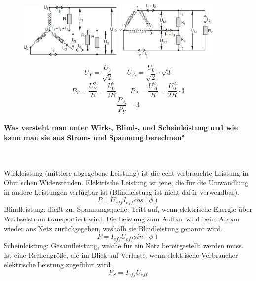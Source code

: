 \documentclass[a4paper, 11pt, ngerman, parskip=half-]{scrartcl}
\begin{document}
\begin{figure}[H]
    \centering
    \begin{minipage}[b]{0.3\textwidth}
        \centering
        \includegraphics[width=5cm]{image/09/7.1}
    \end{minipage}
    \hspace{2cm}
    \begin{minipage}[b]{0.3\textwidth}
        \centering
        \includegraphics[width=5cm]{image/09/7.2}
    \end{minipage}
\end{figure}

\begin{equation}
    U_Y = \frac{U_0}{\sqrt{2}}
    \qquad
    U_{\Delta} = \frac{U_0}{\sqrt{2}} \cdot \sqrt{3}
\end{equation}
\begin{equation}
    P_Y = \frac{U_Y^2}{R} = \frac{U_0^2}{2R}
    \qquad
    P_{\Delta} = \frac{U_{\Delta}^2}{R} = \frac{U_0^2}{2R} \cdot 3
\end{equation}
\begin{equation}
    \frac{P_{\Delta}}{P_Y} = 3
\end{equation}

\paragraph{Was versteht man unter Wirk-, Blind-, und Scheinleistung und wie kann man sie aus Strom-
    und Spannung berechnen?} ~

Wirkleistung (mittlere abgegebene Leistung) ist die echt verbrauchte Leistung in Ohm'schen
Widerständen. Elektrische Leistung ist jene, die für die Umwandlung in andere Leistungen verfügbar ist
(Blindleistung ist nicht dafür verwendbar).
\begin{equation}
    P = U_{eff} I_{eff} cos(\phi)
\end{equation}
Blindleistung: fließt zur Spannungsquelle. Tritt auf, wenn elektrische Energie über Wechselstrom
transportiert wird. Die Leistung zum Aufbau wird beim Abbau wieder ans Netz zurückgegeben, weshalb
sie Blindleistung genannt wird.
\begin{equation}
    P = I_{eff} U_{eff} sin(\phi)
\end{equation}
Scheinleistung: Gesamtleistung, welche für ein Netz bereitgestellt werden muss.  Ist eine
Rechengröße, die im Blick auf Verluste, wenn elektrische Verbraucher elektrische Leistung zugeführt
wird.
\begin{equation}
    P_S = I_{eff} U_{eff}
\end{equation}
\end{document}
